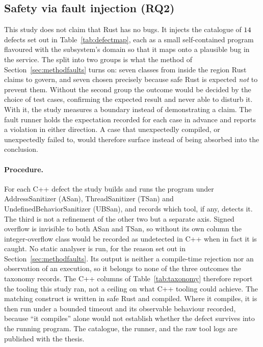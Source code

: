 \documentclass[english,oneside,a4paper,censored,csm,software-track-2020]{HYthesisML}
\begin{document}
\subsection{Safety via fault injection (RQ2)}\label{sec:safetyresults}
This study does not claim that Rust has no bugs. It injects the catalogue of
$14$ defects set out
in Table~\ref{tab:defectmap}, each as a small self-contained program
flavoured with the subsystem's domain so that it maps onto a plausible bug in the service. The
split into two groups is what the method of Section~\ref{sec:methodfaults} turns on: seven
classes from inside the region Rust claims to govern, and seven chosen precisely because safe
Rust is expected \emph{not} to prevent them. Without the second group the outcome would be
decided by the choice of test cases, confirming the expected result and never able to disturb
it. With it, the study measures a boundary instead of demonstrating a claim. The fault runner
holds the expectation recorded for each case in advance and reports a violation in either
direction. A case that unexpectedly compiled, or unexpectedly failed to, would therefore surface
instead of being absorbed into the conclusion.

\paragraph{Procedure.}
For each C++ defect the study builds and runs the program under AddressSanitizer (ASan),
ThreadSanitizer (TSan) and UndefinedBehaviorSanitizer (UBSan), and records which tool, if any,
detects it. The third is not a refinement of the other two but a separate axis. Signed overflow
is invisible to both ASan and TSan, so without its own column the integer-overflow class would
be recorded as undetected in C++ when in fact it is caught. No static analyser is
run, for the reason set out in Section~\ref{sec:methodfaults}. Its output is neither a
compile-time rejection nor an observation of an execution, so it belongs to none of the
three outcomes the taxonomy records. The C++ columns of Table~\ref{tab:taxonomy} therefore
report the tooling this study ran, not a ceiling on what C++ tooling could achieve. The
matching construct is written in safe Rust and compiled. Where it compiles, it is then run
under a bounded timeout and its observable behaviour recorded, because ``it compiles'' alone would
not establish whether the defect survives into the running program. The catalogue, the runner,
and the raw tool logs are published with the thesis.
\end{document}
